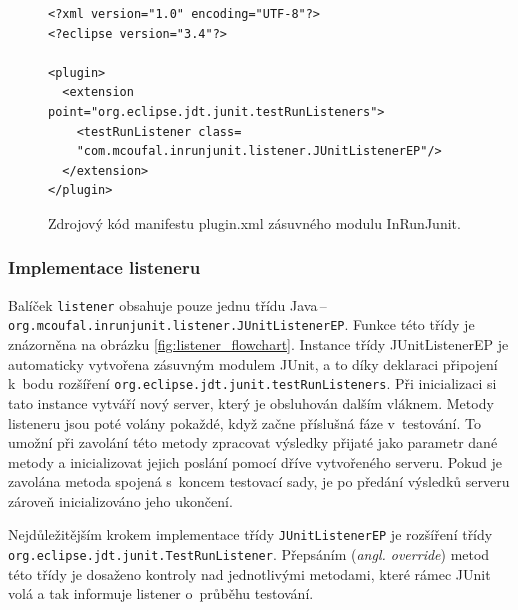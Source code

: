 	\lstset{language=xml}
	\begin{figure}
	  \begin{lstlisting}[frame=single]
<?xml version="1.0" encoding="UTF-8"?>
<?eclipse version="3.4"?>

<plugin>
  <extension point="org.eclipse.jdt.junit.testRunListeners">
    <testRunListener class=
    "com.mcoufal.inrunjunit.listener.JUnitListenerEP"/>
  </extension>
</plugin>
	  \end{lstlisting}
	  \caption{Zdrojový kód manifestu plugin.xml zásuvného modulu InRunJunit.}
	  \label{code:plugin.xml}
	\end{figure}
     
      \subsubsection{Implementace listeneru}
	Balíček \texttt{listener} obsahuje pouze jednu třídu Java\,--\,\texttt{org.\-mcoufal.\-inrunjunit.\-listener.\-JUnitListenerEP}. Funkce této třídy je znázorněna na obrázku \ref{fig:listener_flowchart}. Instance třídy JUnitListenerEP je automaticky vytvořena zásuvným modulem JUnit, a to díky deklaraci připojení k~bodu rozšíření \texttt{org.\-eclipse.\-jdt.\-junit.\-testRunListeners}. Při inicializaci si tato instance vytváří nový server, který je obsluhován dalším vláknem. Metody listeneru jsou poté volány pokaždé, když začne příslušná fáze v~testování. To umožní při zavolání této metody zpracovat výsledky přijaté jako parametr dané metody a inicializovat jejich poslání pomocí dříve vytvořeného serveru. Pokud je zavolána metoda spojená s~koncem testovací sady, je po předání výsledků serveru zároveň inicializováno jeho ukončení.
	
	Nejdůležitějším krokem implementace třídy \texttt{JUnitListenerEP} je rozšíření třídy \texttt{org.\-eclipse.\-jdt.\-junit.\-TestRunListener}. Přepsáním (\emph{angl. override}) metod této třídy je dosaženo kontroly nad jednotlivými metodami, které rámec JUnit volá a tak informuje listener o~průběhu testování.
	
